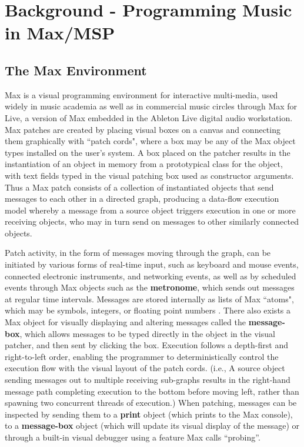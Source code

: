 \documentclass[acmsmall]{acmart}
\begin{document}
\section{Background - Programming Music in Max/MSP}

\subsection{The Max Environment}

Max is a visual programming environment for interactive multi-media, 
used widely in music academia as well as in commercial music circles through Max for Live, 
a version of Max embedded in the Ableton Live digital audio workstation. 
Max patches are created by placing visual boxes on a canvas 
and connecting them graphically with ``patch cords", where a box may be
any of the Max object types installed on the user's system. A box placed on the patcher
results in the instantiation of an object in memory from a prototypical class for the object, with
text fields typed in the visual patching box used as constructor arguments. 
Thus a Max patch consists of a collection of instantiated objects that send messages to each other
in a directed graph, producing a data-flow execution model whereby a message from a source 
object triggers execution in one or more 
receiving objects, who may in turn send on messages to other similarly connected objects. 

Patch activity, in the form of messages moving through the graph, can be initiated by 
various forms of real-time input, such as keyboard and mouse events, connected electronic instruments, and networking 
events, as well as by scheduled events through Max objects such as the \textbf{metronome}, which sends
out messages at regular time intervals. Messages are 
stored internally as lists of Max ``atoms", which may be symbols, integers, or floating point numbers 
\cite{Puckette2002}.
There also exists a Max object for visually displaying and altering messages called the \textbf{message-box},
which allows messages to be typed directly in the object in the visual patcher, and then sent by clicking the box.  
Execution follows a depth-first and right-to-left order, enabling the programmer to deterministically 
control the execution flow with the visual layout of the patch cords. (i.e., A source object sending 
messages out to multiple receiving sub-graphs results in the right-hand message path completing 
execution to the bottom before moving left, rather than spawning two concurrent threads of execution.) When 
patching, messages can be inspected by sending them to a \textbf{print} object (which prints to the Max console),
to a \textbf{message-box} object (which will update its visual display of the message) 
or through a built-in visual debugger using a feature Max calls ``probing”.
\end{document}
